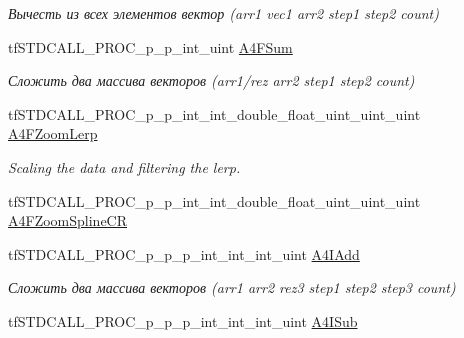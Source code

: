 \begin{DoxyCompactItemize}
\begin{DoxyCompactList}\small\item\em Вычесть из всех элементов вектор (arr1 vec1 arr2 step1 step2 count) \end{DoxyCompactList}\item 
\hypertarget{structs_functions_array_vector_c_p_u_a669ecc71ba2c8613e2aefce177f14bbe}{tf\-S\-T\-D\-C\-A\-L\-L\-\_\-\-P\-R\-O\-C\-\_\-p\-\_\-p\-\_\-int\-\_\-uint \hyperlink{structs_functions_array_vector_c_p_u_a669ecc71ba2c8613e2aefce177f14bbe}{A4\-F\-Sum}}\label{structs_functions_array_vector_c_p_u_a669ecc71ba2c8613e2aefce177f14bbe}

\begin{DoxyCompactList}\small\item\em Сложить два массива векторов (arr1/rez arr2 step1 step2 count) \end{DoxyCompactList}\item 
\hypertarget{structs_functions_array_vector_c_p_u_a1b1be38ff0868b126d1af96fea9aeb71}{tf\-S\-T\-D\-C\-A\-L\-L\-\_\-\-P\-R\-O\-C\-\_\-p\-\_\-p\-\_\-int\-\_\-int\-\_\-double\-\_\-float\-\_\-uint\-\_\-uint\-\_\-uint \hyperlink{structs_functions_array_vector_c_p_u_a1b1be38ff0868b126d1af96fea9aeb71}{A4\-F\-Zoom\-Lerp}}\label{structs_functions_array_vector_c_p_u_a1b1be38ff0868b126d1af96fea9aeb71}

\begin{DoxyCompactList}\small\item\em Scaling the data and filtering the lerp. \end{DoxyCompactList}\item 
tf\-S\-T\-D\-C\-A\-L\-L\-\_\-\-P\-R\-O\-C\-\_\-p\-\_\-p\-\_\-int\-\_\-int\-\_\-double\-\_\-float\-\_\-uint\-\_\-uint\-\_\-uint \hyperlink{structs_functions_array_vector_c_p_u_a4839c6956fbc8ad7a22d3738f325aa00}{A4\-F\-Zoom\-Spline\-C\-R}
\item 
\hypertarget{structs_functions_array_vector_c_p_u_a8ba0af31dcc5256dbce12661164e5cfe}{tf\-S\-T\-D\-C\-A\-L\-L\-\_\-\-P\-R\-O\-C\-\_\-p\-\_\-p\-\_\-p\-\_\-int\-\_\-int\-\_\-int\-\_\-uint \hyperlink{structs_functions_array_vector_c_p_u_a8ba0af31dcc5256dbce12661164e5cfe}{A4\-I\-Add}}\label{structs_functions_array_vector_c_p_u_a8ba0af31dcc5256dbce12661164e5cfe}

\begin{DoxyCompactList}\small\item\em Сложить два массива векторов (arr1 arr2 rez3 step1 step2 step3 count) \end{DoxyCompactList}\item 
\hypertarget{structs_functions_array_vector_c_p_u_a72d8d204b7e47cd2ab76961f23c89647}{tf\-S\-T\-D\-C\-A\-L\-L\-\_\-\-P\-R\-O\-C\-\_\-p\-\_\-p\-\_\-p\-\_\-int\-\_\-int\-\_\-int\-\_\-uint \hyperlink{structs_functions_array_vector_c_p_u_a72d8d204b7e47cd2ab76961f23c89647}{A4\-I\-Sub}}\label{structs_functions_array_vector_c_p_u_a72d8d204b7e47cd2ab76961f23c89647}


\end{DoxyCompactItemize}
